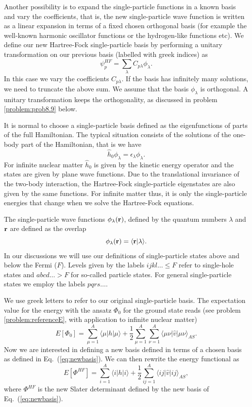 Another possibility is to expand the single-particle functions in a
known basis and vary the coefficients, that is, the new
single-particle wave function is written as a linear expansion in
terms of a fixed chosen orthogonal basis (for example the well-known
harmonic oscillator functions or the hydrogen-like functions etc).  We
define our new Hartree-Fock single-particle basis by performing a
unitary transformation on our previous basis (labelled with greek
indices) as
\begin{equation}
\psi_p^{HF}  = \sum_{\lambda} C_{p\lambda}\phi_{\lambda}. \label{eq:newbasis}
\end{equation}
In this case we vary the coefficients $C_{p\lambda}$. If the basis has
infinitely many solutions, we need to truncate the above sum.  We
assume that the basis $\phi_{\lambda}$ is orthogonal. A unitary
transformation keeps the orthogonality, as discussed in problem \ref{problem:prob8.9}
below.


It is normal to choose a single-particle basis defined as the
eigenfunctions of parts of the full Hamiltonian. The typical situation
consists of the solutions of the one-body part of the Hamiltonian,
that is we have
\[
\hat{h}_0\phi_{\lambda}=\epsilon_{\lambda}\phi_{\lambda}.
\]
For infinite nuclear matter $\hat{h}_0$ is given by the kinetic energy operator and the states are 
given by plane wave functions. Due to the translational invariance of the two-body interaction, the Hartree-Fock single-particle eigenstates
are also given by the same functions. For infinite matter thus, it is only the single-particle energies that change when we solve the  Hartree-Fock
equations. 

The single-particle wave functions $\phi_{\lambda}({\bf r})$, defined
by the quantum numbers $\lambda$ and ${\bf r}$ are defined as the
overlap
\[
   \phi_{\lambda}({\bf r})  = \langle {\bf r} | \lambda \rangle .
\]
In our discussions we will use our definitions of
single-particle states above and below the Fermi ($F$).  Levels given by
the labels $ijkl\dots \le F$ refer to single-hole states and
$abcd\dots > F$ for so-called particle states.  For general
single-particle states we employ the labels $pqrs\dots$.




We use greek letters to refer to our original single-particle basis. The expectation value for the energy with the ansatz $\Phi_0$
for the ground state reads (see problem \ref{problem:referenceE}, with application to infinite nuclear matter)
\[
  E[\Phi_0] = \sum_{\mu=1}^A \langle \mu | h | \mu \rangle
  + \frac{1}{2}\sum_{{\mu}=1}^A\sum_{{\nu}=1}^A \langle \mu\nu|\hat{v}|\mu\nu\rangle_{AS}.
\]
Now we are interested in defining a new basis defined in terms of a
chosen basis as defined in Eq.~(\ref{eq:newbasis}). We can then rewrite
the energy functional as
\begin{equation}
  E[\Phi^{HF}] 
  = \sum_{i=1}^A \langle i | h | i \rangle +
  \frac{1}{2}\sum_{ij=1}^A\langle ij|\hat{v}|ij\rangle_{AS}, \label{FunctionalEPhi2}
\end{equation}
where $\Phi^{HF}$ is the new Slater determinant defined by the new
basis of Eq.~(\ref{eq:newbasis}).





